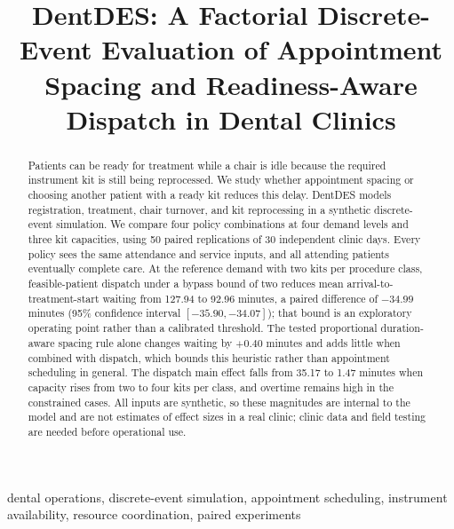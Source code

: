 \documentclass[conference]{IEEEtran}
\begin{document}
\title{DentDES: A Factorial Discrete-Event Evaluation of Appointment Spacing and Readiness-Aware Dispatch in Dental Clinics}

\maketitle

\begin{abstract}
Patients can be ready for treatment while a chair is idle because the required instrument kit is still being reprocessed. We study whether appointment spacing or choosing another patient with a ready kit reduces this delay. DentDES models registration, treatment, chair turnover, and kit reprocessing in a synthetic discrete-event simulation. We compare four policy combinations at four demand levels and three kit capacities, using 50 paired replications of 30 independent clinic days. Every policy sees the same attendance and service inputs, and all attending patients eventually complete care. At the reference demand with two kits per procedure class, feasible-patient dispatch under a bypass bound of two reduces mean arrival-to-treatment-start waiting from 127.94 to 92.96 minutes, a paired difference of $-34.99$ minutes (95\% confidence interval $[-35.90,-34.07]$); that bound is an exploratory operating point rather than a calibrated threshold. The tested proportional duration-aware spacing rule alone changes waiting by $+0.40$ minutes and adds little when combined with dispatch, which bounds this heuristic rather than appointment scheduling in general. The dispatch main effect falls from 35.17 to 1.47 minutes when capacity rises from two to four kits per class, and overtime remains high in the constrained cases. All inputs are synthetic, so these magnitudes are internal to the model and are not estimates of effect sizes in a real clinic; clinic data and field testing are needed before operational use.
\end{abstract}

\begin{IEEEkeywords}
dental operations, discrete-event simulation, appointment scheduling, instrument availability, resource coordination, paired experiments
\end{IEEEkeywords}
\end{document}
